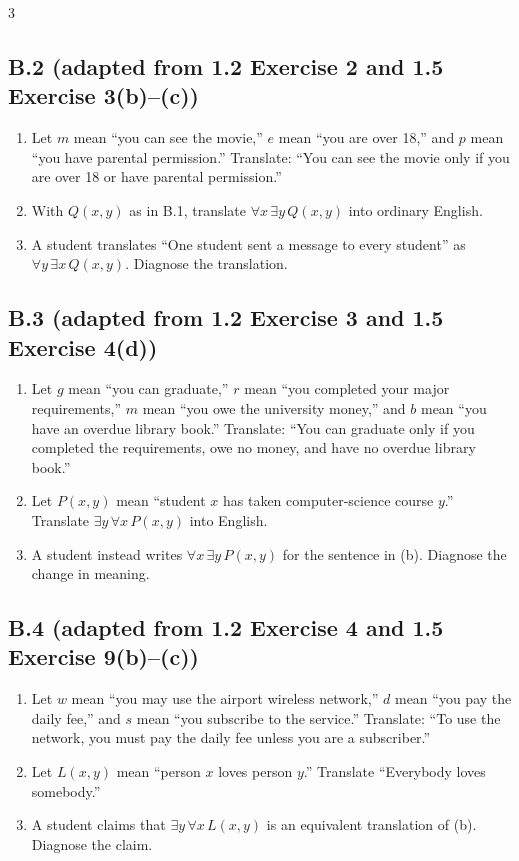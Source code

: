 \documentclass{article}
\newcommand{\problem}[2]{%
  \par
  \subsection*{#1 {\normalfont\footnotesize (#2)}}%
}
\begin{document}
\begin{multicols}{3}
\columnbreak
\problem{B.2}{adapted from 1.2 Exercise 2 and 1.5 Exercise 3(b)--(c)}
\begin{enumerate}[label=(\alph*)]
  \item Let $m$ mean ``you can see the movie,'' $e$ mean ``you are over 18,''
        and $p$ mean ``you have parental permission.'' Translate: ``You can
        see the movie only if you are over 18 or have parental permission.''
  \item With $Q(x,y)$ as in B.1, translate $\forall x\,\exists y\,Q(x,y)$
        into ordinary English.
  \item A student translates ``One student sent a message to every student''
        as $\forall y\,\exists x\,Q(x,y)$. Diagnose the translation.
\end{enumerate}

\problem{B.3}{adapted from 1.2 Exercise 3 and 1.5 Exercise 4(d)}
\begin{enumerate}[label=(\alph*)]
  \item Let $g$ mean ``you can graduate,'' $r$ mean ``you completed your major
        requirements,'' $m$ mean ``you owe the university money,'' and $b$
        mean ``you have an overdue library book.'' Translate: ``You can
        graduate only if you completed the requirements, owe no money, and
        have no overdue library book.''
  \item Let $P(x,y)$ mean ``student $x$ has taken computer-science course
        $y$.'' Translate $\exists y\,\forall x\,P(x,y)$ into English.
  \item A student instead writes $\forall x\,\exists y\,P(x,y)$ for the
        sentence in (b). Diagnose the change in meaning.
\end{enumerate}

\columnbreak
\problem{B.4}{adapted from 1.2 Exercise 4 and 1.5 Exercise 9(b)--(c)}
\begin{enumerate}[label=(\alph*)]
  \item Let $w$ mean ``you may use the airport wireless network,'' $d$ mean
        ``you pay the daily fee,'' and $s$ mean ``you subscribe to the
        service.'' Translate: ``To use the network, you must pay the daily fee
        unless you are a subscriber.''
  \item Let $L(x,y)$ mean ``person $x$ loves person $y$.'' Translate
        ``Everybody loves somebody.''
  \item A student claims that $\exists y\,\forall x\,L(x,y)$ is an equivalent
        translation of (b). Diagnose the claim.
\end{enumerate}


\end{multicols}
\end{document}
